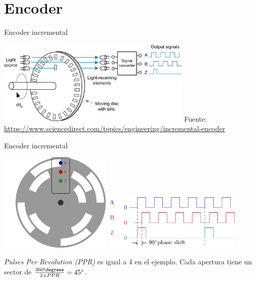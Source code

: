 \documentclass[presentation,aspectratio=169]{beamer}
\begin{document}
\section{Encoder}
\label{sec:orgdc47c58}
\begin{frame}[label={sec:org72216b3}]{Encoder incremental}
\begin{center}
\includegraphics[width=0.7\textwidth]{../../figures/encoder-im.jpg}
{\footnotesize Fuente: \url{https://www.sciencedirect.com/topics/engineering/incremental-encoder}}
\end{center}
\end{frame}

\begin{frame}[label={sec:orgaedb1d5}]{Encoder incremental}
\begin{center}
\includegraphics[width=0.4\textwidth]{../../figures/encoder-disc}
\includegraphics[width=0.5\textwidth]{../../figures/encoder-signals}
\end{center}

\emph{Pulses Per Revolution (PPR)} es igual a 4 en el ejemplo. Cada apertura tiene un sector de \(\frac{360\degrees}{2 \times PPR} = 45\degree\).
\end{frame}
\end{document}
